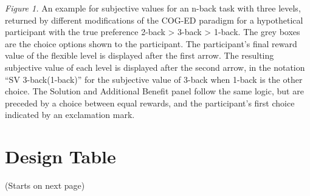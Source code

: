 \documentclass[
  man,floatsintext]{apa6}
\begin{document}
\emph{Figure 1.} An example for subjective values for an n-back task with three levels, returned by different modifications of the COG-ED paradigm for a hypothetical participant with the true preference 2-back \textgreater{} 3-back \textgreater{} 1-back. The grey boxes are the choice options shown to the participant. The participant's final reward value of the flexible level is displayed after the first arrow. The resulting subjective value of each level is displayed after the second arrow, in the notation ``SV 3-back(1-back)'' for the subjective value of 3-back when 1-back is the other choice. The Solution and Additional Benefit panel follow the same logic, but are preceded by a choice between equal rewards, and the participant's first choice indicated by an exclamation mark.

\newpage

\hypertarget{DesignTableSection}{%
\section{Design Table}\label{DesignTableSection}}

(Starts on next page)


\end{document}
